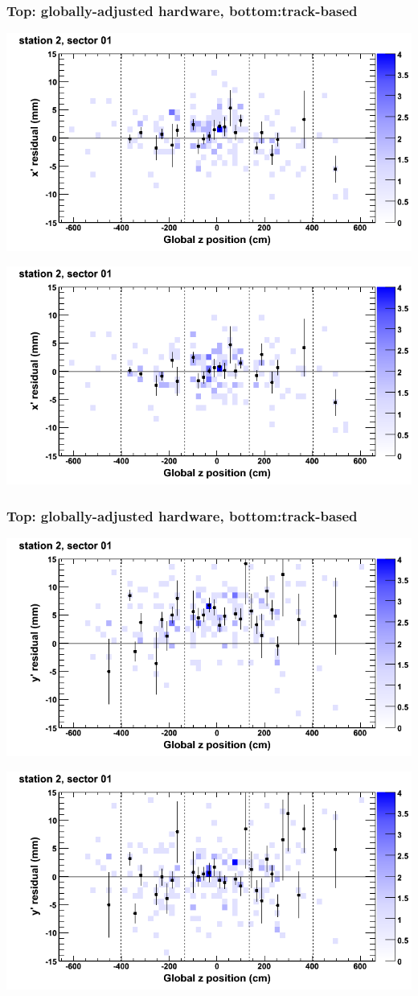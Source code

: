 \documentclass[compress]{beamer}
\begin{document}
\begin{frame}
\frametitle{Top: globally-adjusted hardware, bottom:track-based}
\includegraphics[width=0.7\linewidth]{NOV4_mapplots_HW/DTvsz_st2sec01_x.png}

\includegraphics[width=0.7\linewidth]{NOV4_mapplots/DTvsz_st2sec01_x.png}
\end{frame}

\begin{frame}
\frametitle{Top: globally-adjusted hardware, bottom:track-based}
\includegraphics[width=0.7\linewidth]{NOV4_mapplots_HW/DTvsz_st2sec01_y.png}

\includegraphics[width=0.7\linewidth]{NOV4_mapplots/DTvsz_st2sec01_y.png}
\end{frame}
\end{document}
